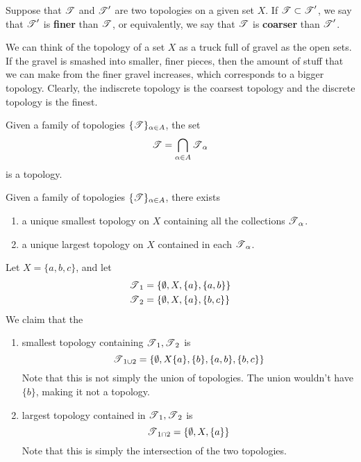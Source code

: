   \begin{definition}
    Suppose that $\operatorname{\mathscr{T}}$ and $\operatorname{\mathscr{T}}^\prime$ are two topologies on a given set $X$. If $\operatorname{\mathscr{T}} \subset \operatorname{\mathscr{T}}^\prime$, we say that $\operatorname{\mathscr{T}}^\prime$ is \textbf{finer} than $\operatorname{\mathscr{T}}$, or equivalently, we say that $\operatorname{\mathscr{T}}$ is \textbf{coarser} than $\operatorname{\mathscr{T}}^\prime$. 
  \end{definition}

  We can think of the topology of a set $X$ as a truck full of gravel as the open sets. If the gravel is smashed into smaller, finer pieces, then the amount of stuff that we can make from the finer gravel increases, which corresponds to a bigger topology. Clearly, the indiscrete topology is the coarsest topology and the discrete topology is the finest. 

  \begin{theorem}
    Given a family of topologies $\{\operatorname{\mathscr{T}}\}_{\alpha \in A}$, the set 
    \begin{equation}
      \operatorname{\mathscr{T}} = \bigcap_{\alpha \in A} \operatorname{\mathscr{T}}_\alpha
    \end{equation}
    is a topology. 
  \end{theorem}

  \begin{corollary}
    Given a family of topologies $\{\operatorname{\mathscr{T}}\}_{\alpha \in A}$, there exists 
    \begin{enumerate}
      \item a unique smallest topology on $X$ containing all the collections $\operatorname{\mathscr{T}}_\alpha$. 
      \item a unique largest topology on $X$ contained in each $\operatorname{\mathscr{T}}_\alpha$. 
    \end{enumerate}
  \end{corollary} 

  \begin{example}
    Let $X = \{a, b, c\}$, and let 
    \begin{align}
      \operatorname{\mathscr{T}}_1 & = \{\emptyset, X, \{a\}, \{a, b\}\} \\
      \operatorname{\mathscr{T}}_2 & = \{\emptyset, X, \{a\}, \{b, c\}\}
    \end{align}
    We claim that the 
    \begin{enumerate}
      \item smallest topology containing $\operatorname{\mathscr{T}}_1, \operatorname{\mathscr{T}}_2$ is 
      \begin{equation}
        \operatorname{\mathscr{T}}_{1 \cup 2} = \{\emptyset, X \{a\}, \{b\}, \{a, b\}, \{b, c\}\}
      \end{equation} 
      Note that this is not simply the union of topologies. The union wouldn't have $\{b\}$, making it not a topology. 

      \item largest topology contained in $\operatorname{\mathscr{T}}_1, \operatorname{\mathscr{T}}_2$ is 
      \begin{equation}
        \operatorname{\mathscr{T}}_{1 \cap 2} = \{\emptyset, X, \{a\}\}
      \end{equation}
      Note that this is simply the intersection of the two topologies. 
    \end{enumerate}
  \end{example}

